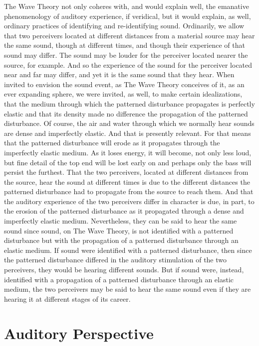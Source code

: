 The Wave Theory not only coheres with, and would explain well, the emanative phenomenology of auditory experience, if veridical, but it would explain, as well, ordinary practices of identifying and re-identifying sound. Ordinarily, we allow that two perceivers located at different distances from a material source may hear the same sound, though at different times, and though their experience of that sound may differ. The sound may be louder for the perceiver located nearer the source, for example. And so the experience of the sound for the perceiver located near and far may differ, and yet it is the same sound that they hear. When invited to envision the sound event, as The Wave Theory conceives of it, as an ever expanding sphere, we were invited, as well, to make certain idealizations, that the medium through which the patterned disturbance propagates is perfectly elastic and that its density made no difference the propagation of the patterned disturbance. Of course, the air and water through which we normally hear sounds are dense and imperfectly elastic. And that is presently relevant. For that means that the patterned disturbance will erode as it propagates through the imperfectly elastic medium. As it loses energy, it will become, not only less loud, but fine detail of the top end will be lost early on and perhaps only the bass will persist the furthest. That the two perceivers, located at different distances from the source, hear the sound at different times is due to the different distances the patterned disturbance had to propagate from the source to reach them. And that the auditory experience of the two perceivers differ in character is due, in part, to the erosion of the patterned disturbance as it propagated through a dense and imperfectly elastic medium. Nevertheless, they can be said to hear the same sound since sound, on The Wave Theory, is not identified with a patterned disturbance but with the propagation of a patterned disturbance through an elastic medium. If sound were identified with a patterned disturbance, then since the patterned disturbance differed in the auditory stimulation of the two perceivers, they would be hearing different sounds. But if sound were, instead, identified with a propagation of a patterned disturbance through an elastic medium, the two perceivers may be said to hear the same sound even if they are hearing it at different stages of its career.


\section{Auditory Perspective} %
\label{sec:auditory_perspective}


